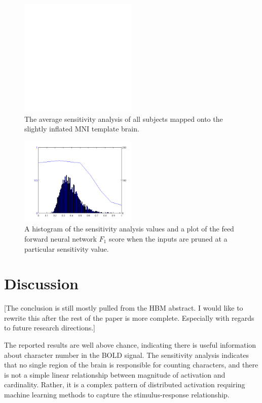 \documentclass[final]{article}
\begin{document}
\begin{figure}[!htbp]
\centering
\includegraphics[width=0.5\textwidth]{figures/placeholder}
\caption{The average sensitivity analysis of all subjects mapped onto the slightly inflated MNI template brain.}
\label{fig:MNI-average-sensitivity}
\end{figure}

\begin{figure}[!htbp]
\centering
\includegraphics[width=0.5\textwidth]{figures/sensitivity-cutoff}
\caption{A histogram of the sensitivity analysis values and a plot of the feed forward neural network $F_1$ score when the inputs are pruned at a particular sensitivity value. }
\label{fig:sensitivity-cutoff}
\end{figure}

\section{Discussion}
[The conclusion is still mostly pulled from the HBM abstract. I would like to rewrite this after the rest of the paper is more complete. Especially with regards to future research directions.]

The reported results are well above chance, indicating there is useful information about character number in the BOLD signal.
The sensitivity analysis indicates that no single region of the brain is responsible for counting characters, and there is not a simple linear relationship between magnitude of activation and cardinality.
Rather, it is a complex pattern of distributed activation requiring machine learning methods to capture the stimulus-response relationship.
\end{document}
